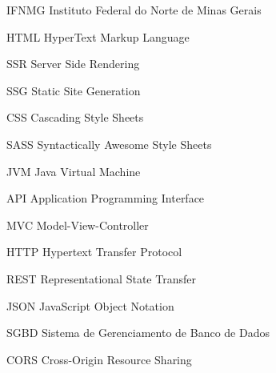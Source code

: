 
\begin{siglas}
  \item[IFNMG] Instituto Federal do Norte de Minas Gerais
  \item[HTML] HyperText Markup Language
  \item[SSR] Server Side Rendering
  \item[SSG] Static Site Generation
  \item[CSS] Cascading Style Sheets
  \item[SASS] Syntactically Awesome Style Sheets
  \item[JVM] Java Virtual Machine
  \item[API] Application Programming Interface
  \item[MVC] Model-View-Controller
  \item[HTTP] Hypertext Transfer Protocol
  \item[REST] Representational State Transfer
  \item[JSON] JavaScript Object Notation
  \item[SGBD] Sistema de Gerenciamento de Banco de Dados
  \item[CORS] Cross-Origin Resource Sharing
\end{siglas}